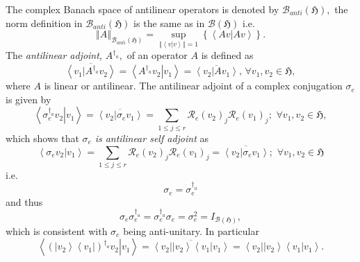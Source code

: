 \documentclass[aps,preprint]{revtex4}
\begin{document}
The complex Banach space of antilinear operators is denoted by $\mathcal{B}%
_{anti}\left( \mathfrak{H}\right) ,$ the norm definition in $\mathcal{B}%
_{anti}\left( \mathfrak{H}\right) $ is the same as in $\mathcal{B}\left( 
\mathfrak{H}\right) $ i.e. 
\begin{equation}
\left\Vert A\right\Vert _{\mathcal{B}_{anti}\left( \mathfrak{H}\right)
}=\sup\limits_{\left\Vert \left\langle \left. v\right\vert v\right\rangle
\right\Vert =1}\left\{ \left\langle \left. Av\right\vert Av\right\rangle
\right\} .
\end{equation}%
The \emph{antilinear adjoint, }$A^{\dagger _{a}},$ of an operator $A$ is
defined as 
\begin{equation}
\overline{\left\langle \left. v_{1}\right\vert A^{\dagger
_{a}}v_{2}\right\rangle }=\left\langle \left. A^{\dagger
_{a}}v_{2}\right\vert v_{1}\right\rangle =\overline{\left\langle \left.
v_{2}\right\vert Av_{1}\right\rangle },\,\forall v_{1},v_{2}\in \mathfrak{H,}
\end{equation}%
where $A$ is linear or antilinear. The antilinear adjoint of a complex
conjugation $\sigma _{e}$ is given by 
\begin{equation}
\left\langle \left. \sigma _{e}^{\dagger _{a}}v_{2}\right\vert
v_{1}\right\rangle =\overline{\left\langle \left. v_{2}\right\vert \sigma
_{e}v_{1}\right\rangle }=\sum_{1\leq j\leq r}\mathcal{R}_{e}\left(
v_{2}\right) _{j}\mathcal{R}_{e}\left( v_{1}\right) _{j};\,\,\forall
v_{1},v_{2}\in \mathfrak{H,}
\end{equation}%
which shows that $\sigma _{e}$ \emph{is antilinear self adjoint} as 
\begin{equation}
\left\langle \left. \sigma _{e}v_{2}\right\vert v_{1}\right\rangle
=\sum_{1\leq j\leq r}\mathcal{R}_{e}\left( v_{2}\right) _{j}\mathcal{R}%
_{e}\left( v_{1}\right) _{j}=\overline{\left\langle \left. v_{2}\right\vert
\sigma _{e}v_{1}\right\rangle };\,\,\forall v_{1},v_{2}\in \mathfrak{H}
\end{equation}%
i.e. 
\begin{equation}
\sigma _{e}=\sigma _{e}^{\dagger _{a}}
\end{equation}%
and thus 
\begin{equation}
\sigma _{e}\sigma _{e}^{\dagger _{a}}=\sigma _{e}^{\dagger _{a}}\sigma
_{e}=\sigma _{e}^{2}=I_{\mathcal{B}\left( \mathfrak{H}\right) },
\end{equation}%
which is consistent with $\sigma _{e}$ being anti-unitary. In particular 
\begin{equation}
\left\langle \left. \left( \left\vert v_{2}\right\rangle \left\langle
v_{1}\right\vert \right) ^{\dagger _{a}}v_{2}\right\vert v_{1}\right\rangle =%
\overline{\left\langle \left. v_{2}\right\vert \left\vert v_{2}\right\rangle
\left\langle v_{1}\right\vert v_{1}\right\rangle }=\left\langle \left.
v_{2}\right\vert \left\vert v_{2}\right\rangle \left\langle v_{1}\right\vert
v_{1}\right\rangle .
\end{equation}
\end{document}
